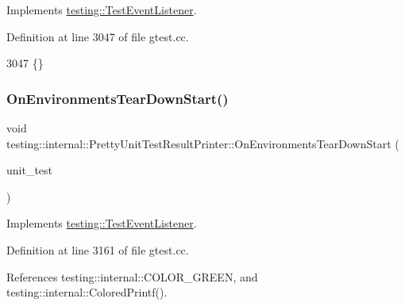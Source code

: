 Implements \hyperlink{classtesting_1_1TestEventListener_a9ea04fa7f447865ba76df35e12ba2092}{testing\+::\+Test\+Event\+Listener}.



Definition at line 3047 of file gtest.\+cc.


\begin{DoxyCode}
3047 \{\}
\end{DoxyCode}
\mbox{\label{classtesting_1_1internal_1_1PrettyUnitTestResultPrinter_afea9dc849c92fdbc1d8505f4c74ffc1a}} 
\subsubsection{\texorpdfstring{On\+Environments\+Tear\+Down\+Start()}{OnEnvironmentsTearDownStart()}}
{\footnotesize\ttfamily void testing\+::internal\+::\+Pretty\+Unit\+Test\+Result\+Printer\+::\+On\+Environments\+Tear\+Down\+Start (\begin{DoxyParamCaption}\item[{const \hyperlink{classtesting_1_1UnitTest}{Unit\+Test} \&}]{unit\+\_\+test }\end{DoxyParamCaption})\hspace{0.3cm}{\ttfamily [virtual]}}



Implements \hyperlink{classtesting_1_1TestEventListener_a468b5e6701bcb86cb2c956caadbba5e4}{testing\+::\+Test\+Event\+Listener}.



Definition at line 3161 of file gtest.\+cc.



References testing\+::internal\+::\+C\+O\+L\+O\+R\+\_\+\+G\+R\+E\+EN, and testing\+::internal\+::\+Colored\+Printf().


